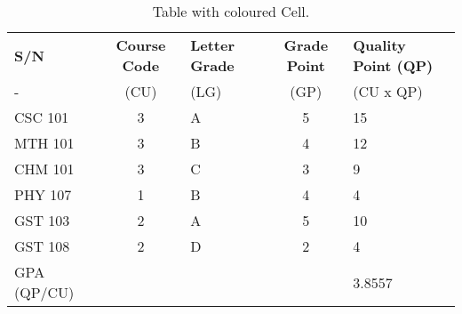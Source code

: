\documentclass{article}
\begin{document}
	\begin{table}[h!]
		\begin{center}
		\caption{Table with coloured Cell.}
		\label{tab:Table 1}
		\begin{tabular}{l|c|l|c|l}
			\hline
		\cellcolor{red!35}\textbf{S/N} & \textbf{Course Code} & \textbf{Letter Grade} & \textbf{Grade Point} & \textbf{Quality Point (QP)} \\
			\cellcolor{blue!25}- & (CU) & (LG) & (GP) & (CU x QP)\\
			\hline
			\cellcolor{blue!25} CSC 101 & 3 & A & 5 & 15\\
			\cellcolor{blue!25} MTH 101 & 3 & B & 4 & 12\\
			\cellcolor{blue!25} CHM 101 & 3 & C & 3 & 9\\
			\cellcolor{blue!25} PHY 107 & 1 & B & 4 & 4\\
			\cellcolor{blue!25} GST 103 & 2 & A & 5 & 10\\
			\cellcolor{blue!25} GST 108 & 2 & D & 2 & 4\\
			\cellcolor{yellow!45} GPA (QP/CU) & & & & 3.8557\\
			\hline
		\end{tabular}
         \end{center}
	\end{table}

		
	
\end{document}
